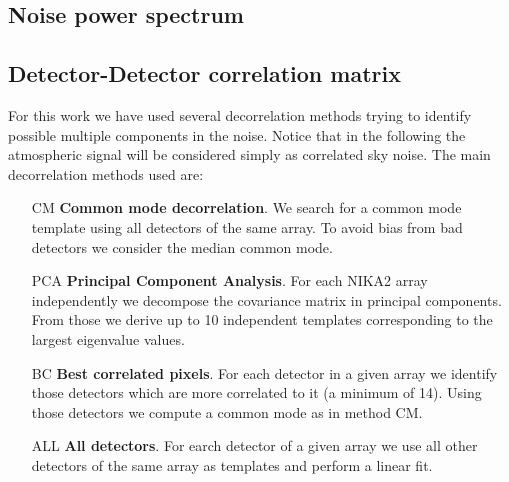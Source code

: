 %
%
%
%


%
%    
%
\subsection{Noise power spectrum}


%
%
%

\subsection{Detector-Detector correlation matrix}

For this work we have used several decorrelation methods trying to identify possible multiple components in the noise. Notice that in the following the atmospheric signal will be considered simply as correlated sky noise. The main decorrelation methods used are:

\begin{enumerate}
\item[CM] {\bf Common mode decorrelation}. We search for a common mode template using all detectors of the same array. To avoid bias from bad detectors we consider the median common mode.

\item[PCA] {\bf Principal Component Analysis}. For each NIKA2 array independently we decompose the covariance matrix in principal components. From those we derive up to 10 independent templates corresponding to the largest eigenvalue values.

\item[BC] {\bf Best correlated pixels}. For each detector in a given array we identify those detectors which are more correlated to it (a minimum of 14). Using those detectors we compute a common mode as in method CM. 

\item[ALL] {\bf All detectors}. For earch detector of a given array we use all other detectors of the same array as templates and perform a linear fit.

\end{enumerate}

